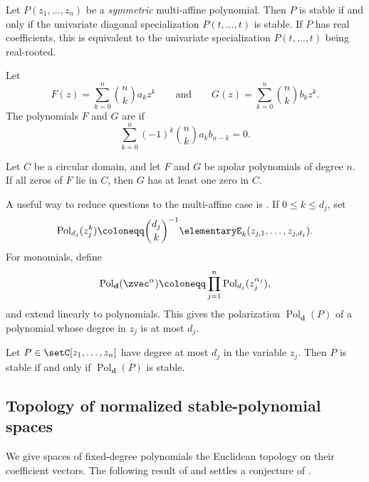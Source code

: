 \begin{theorem}
Let $P(z_1,\dotsc,z_n)$ be a \emph{symmetric} multi-affine polynomial.
Then $P$ is stable if and only if the univariate diagonal specialization
$P(t,\dotsc,t)$ is stable.
If $P$ has real coefficients, this is equivalent to the univariate
specialization $P(t,\dotsc,t)$ being real-rooted.
\end{theorem}

\begin{definition}
Let
\[
  F(z)=\sum_{k=0}^n \binom{n}{k} a_k z^k
  \qquad\text{and}\qquad
  G(z)=\sum_{k=0}^n \binom{n}{k} b_k z^k.
\]
The polynomials $F$ and $G$ are \label{apolarPolynomial} if
\[
  \sum_{k=0}^n (-1)^k \binom{n}{k} a_k b_{n-k}=0.
\]
\end{definition}

\begin{theorem}
Let $C$ be a circular domain, and let $F$ and $G$ be apolar
polynomials of degree $n$.  If all zeros of $F$ lie in $C$, then $G$
has at least one zero in $C$.
\end{theorem}

A useful way to reduce questions to the multi-affine case is
\label{polarizationDefinition}.
If $0 \leq k \leq d_j$, set
\[
 \operatorname{Pol}_{d_j}(z_j^k)
 \coloneqq \binom{d_j}{k}^{-1}
 \elementaryE_k(z_{j,1},\dotsc,z_{j,d_j}).
\]
For monomials, define
\[
 \operatorname{Pol}_{\mathbf{d}}(\zvec^\alpha)
 \coloneqq
 \prod_{j=1}^n \operatorname{Pol}_{d_j}(z_j^{\alpha_j}),
\]
and extend linearly to polynomials.  This gives the polarization
$\operatorname{Pol}_{\mathbf{d}}(P)$ of a polynomial whose degree in $z_j$
is at most $d_j$.

\begin{theorem}
Let $P \in \setC[z_1,\dotsc,z_n]$ have degree at most $d_j$ in the variable
$z_j$.  Then $P$ is stable if and only if
$\operatorname{Pol}_{\mathbf{d}}(P)$ is stable.
\end{theorem}


\subsection[stablePolynomialTopology]{Topology of normalized stable-polynomial spaces}

We give spaces of fixed-degree polynomials the Euclidean topology on their
coefficient vectors. The following result of  and
 settles a conjecture of .

